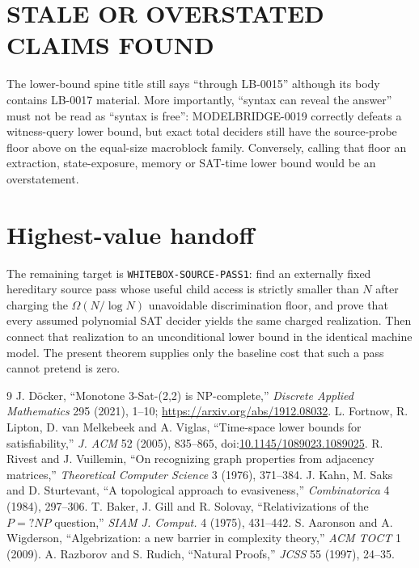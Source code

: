 \documentclass[11pt]{article}
\begin{document}
\section{STALE OR OVERSTATED CLAIMS FOUND}

The lower-bound spine title still says ``through LB-0015'' although its body
contains LB-0017 material.  More importantly, ``syntax can reveal the answer''
must not be read as ``syntax is free'': MODELBRIDGE-0019 correctly defeats a
witness-query lower bound, but exact total deciders still have the source-probe
floor above on the equal-size macroblock family.  Conversely, calling that
floor an extraction, state-exposure, memory or SAT-time lower bound would be an
overstatement.

\section{Highest-value handoff}

The remaining target is \texttt{WHITEBOX-SOURCE-PASS1}: find an externally
fixed hereditary source pass whose useful child access is strictly smaller
than $N$ after charging the $\Omega(N/\log N)$ unavoidable discrimination floor,
and prove that every assumed polynomial SAT decider yields the same charged
realization.  Then connect that realization to an unconditional lower bound in
the identical machine model.  The present theorem supplies only the baseline
cost that such a pass cannot pretend is zero.

\begin{thebibliography}{9}
J. D\"ocker, ``Monotone 3-Sat-(2,2) is NP-complete,''
\emph{Discrete Applied Mathematics} 295 (2021), 1--10;
\url{https://arxiv.org/abs/1912.08032}.
L. Fortnow, R. Lipton, D. van Melkebeek and A. Viglas,
``Time-space lower bounds for satisfiability,'' \emph{J. ACM} 52 (2005),
835--865, doi:\href{https://doi.org/10.1145/1089023.1089025}{10.1145/1089023.1089025}.
R. Rivest and J. Vuillemin, ``On recognizing graph properties from adjacency
matrices,'' \emph{Theoretical Computer Science} 3 (1976), 371--384.
J. Kahn, M. Saks and D. Sturtevant, ``A topological approach to evasiveness,''
\emph{Combinatorica} 4 (1984), 297--306.
T. Baker, J. Gill and R. Solovay, ``Relativizations of the $P=?NP$ question,''
\emph{SIAM J. Comput.} 4 (1975), 431--442.
S. Aaronson and A. Wigderson, ``Algebrization: a new barrier in complexity
theory,'' \emph{ACM TOCT} 1 (2009).
A. Razborov and S. Rudich, ``Natural Proofs,'' \emph{JCSS} 55 (1997), 24--35.
\end{thebibliography}

\end{document}
